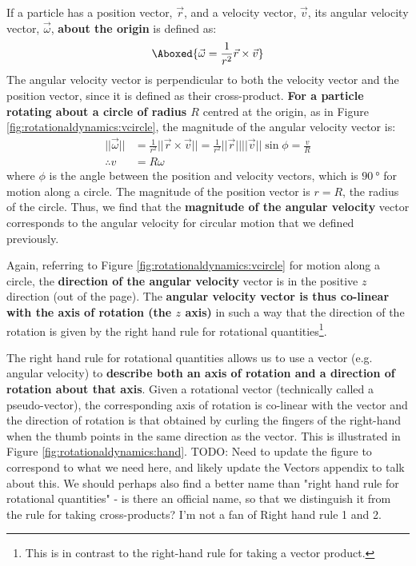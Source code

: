If a particle has a position vector, $\vec r$, and a velocity vector, $\vec v$, its angular velocity vector, $\vec \omega$, \textbf{about the origin} is defined as:
\begin{align}
\Aboxed{\vec \omega = \frac{1}{r^2} \vec r \times \vec v}
\end{align}
The angular velocity vector is perpendicular to both the velocity vector and the position vector, since it is defined as their cross-product. \textbf{For a particle rotating about a circle of radius $R$} centred at the origin, as in Figure \ref{fig:rotationaldynamics:vcircle}, the magnitude of the angular velocity vector is:
\begin{align*}
||\vec\omega|| &=\frac{1}{r^2} || \vec r \times \vec v||= \frac{1}{r^2}||\vec r|| ||\vec v||\sin\phi= \frac{v}{R}\\
\therefore v &= R\omega
\end{align*}
where $\phi$ is the angle between the position and velocity vectors, which is $\SI{90}{\degree}$ for motion along a circle. The magnitude of the position vector is $r=R$, the radius of the circle. Thus, we find that the \textbf{magnitude of the angular velocity} vector corresponds to the angular velocity for circular motion that we defined previously.

Again, referring to Figure \ref{fig:rotationaldynamics:vcircle} for motion along a circle, the \textbf{direction of the angular velocity} vector is in the positive $z$ direction (out of the page). The \textbf{angular velocity vector is thus co-linear with the axis of rotation (the $z$ axis)} in such a way that the direction of the rotation is given by the right hand rule for rotational quantities\footnote{This is in contrast to the right-hand rule for taking a vector product.}. 

The right hand rule for rotational quantities allows us to use a vector (e.g. angular velocity) to \textbf{describe both an axis of rotation and a direction of rotation about that axis}. Given a rotational vector (technically called a pseudo-vector), the corresponding axis of rotation is co-linear with the vector and the direction of rotation is that obtained by curling the fingers of the right-hand when the thumb points in the same direction as the vector. This is illustrated in Figure \ref{fig:rotationaldynamics:hand}.
TODO: Need to update the figure to correspond to what we need here, and likely update the Vectors appendix to talk about this. We should perhaps also find a better name than "right hand rule for rotational quantities" - is there an official name, so that we distinguish it from the rule for taking cross-products? I'm not a fan of Right hand rule 1 and 2.

